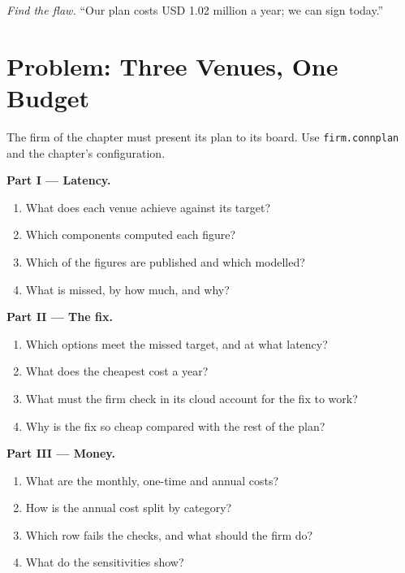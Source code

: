 \begin{exercise}[$\star\star\star$]\label{exo:nw:build-a-connectivity-plan:8}
\emph{Find the flaw.} ``Our plan costs USD 1.02 million a year; we can sign today.''
\end{exercise}

\section{Problem: Three Venues, One Budget}

\begin{problem}\label{pb:nw:build-a-connectivity-plan:1}
The firm of the chapter must present its plan to its board. Use \texttt{firm.connplan} and the chapter's configuration.

\medskip\noindent\textbf{Part I --- Latency.}
\begin{enumerate}
\item What does each venue achieve against its target?
\item Which components computed each figure?
\item Which of the figures are published and which modelled?
\item What is missed, by how much, and why?
\end{enumerate}

\medskip\noindent\textbf{Part II --- The fix.}
\begin{enumerate}[resume]
\item Which options meet the missed target, and at what latency?
\item What does the cheapest cost a year?
\item What must the firm check in its cloud account for the fix to work?
\item Why is the fix so cheap compared with the rest of the plan?
\end{enumerate}

\medskip\noindent\textbf{Part III --- Money.}
\begin{enumerate}[resume]
\item What are the monthly, one-time and annual costs?
\item How is the annual cost split by category?
\item Which row fails the checks, and what should the firm do?
\item What do the sensitivities show?
\end{enumerate}


\end{problem}
